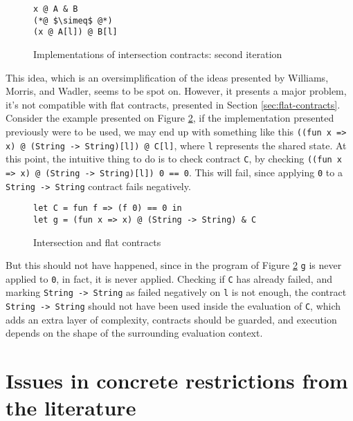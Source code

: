 \documentclass[sigplan,10pt,review,anonymous]{acmart}
\newcommand{\info}[2][1=]{}
\newcommand{\nickel}[1]{\lstinline[language=nickel]{#1}}
\begin{document}
\begin{figure}[h]
\begin{lstlisting}[language=nickel, title=Implementation]
x @ A & B
(*@ $\simeq$ @*)
(x @ A[l]) @ B[l]
\end{lstlisting}
\caption{Implementations of intersection contracts: second iteration}
\label{fig:inter-contracts-2}
\end{figure}

This idea, which is an oversimplification of the ideas
presented by Williams, Morris, and Wadler, seems to be spot on.
However, it presents a major problem, it's not compatible with flat contracts,
presented in Section \ref{sec:flat-contracts}.
Consider the example presented on Figure \ref{fig:inter-flat-contracts},
if the implementation presented previously were to be used, we may end up with
something like this \nickel{((fun x => x) @ (String -> String)[l]) @ C[l]}, where
\nickel{l} represents the shared state.
At this point, the intuitive thing to do is to check contract \nickel{C}, by checking
\nickel{((fun x => x) @ (String -> String)[l]) 0 == 0}.
This will fail, since applying \nickel{0} to a \nickel{String -> String} contract
fails negatively.

\begin{figure}[h]
\begin{lstlisting}[language=nickel]
let C = fun f => (f 0) == 0 in
let g = (fun x => x) @ (String -> String) & C
\end{lstlisting}
\caption{Intersection and flat contracts}
\label{fig:inter-flat-contracts}
\end{figure}

But this should not have happened, since in the program of Figure \ref{fig:inter-flat-contracts}
\nickel{g} is never applied to \nickel{0}, in fact, it is never applied.
Checking if \nickel{C} has already failed, and marking \nickel{String -> String} as
failed negatively on \nickel{l} is not enough, the contract \nickel{String -> String}
should not have been used inside the evaluation of \nickel{C}, which
adds an extra layer of complexity, contracts should be guarded, and execution
depends on the shape of the surrounding evaluation context.

\newpage

\section{Issues in concrete restrictions from the literature}
\info{The various papers and the tradeoffs they make}
\end{document}
